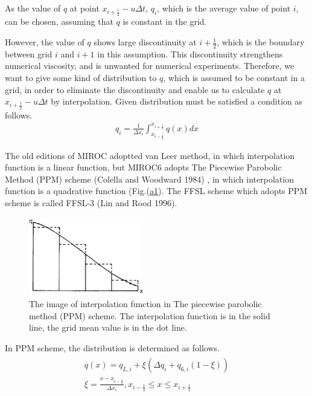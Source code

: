 As the value of \(q\) at point \(x_{i+\frac{1}{2}}-u\Delta t\), \(q_{i}\), which is the average value of point \(i\), can be chosen, assuming that \(q\) is constant in the grid.

However, the value of \(q\) shows large discontinuity at \(i+\frac{1}{2}\), which is the boundary between grid \(i\) and \(i+1\) in this assumption. This discontinuity strengthens numerical viscosity,
and is unwanted for numerical experiments. Therefore, we want to give some kind of distribution to \(q\), which is assumed to be constant in a grid, in order to eliminate the discontinuity and enable
us to calculate \(q\) at \(x_{i+\frac{1}{2}}-u\Delta t\) by interpolation. Given distribution must be satisfied a condition as follows.
\begin{eqnarray}q_{i}=\frac{1}{\Delta x_{i}} \int_{x_{i-\frac{1}{2}}}^{x_{i+\frac{1}{2}}} q(x) dx\end{eqnarray}

The old editions of MIROC adoptted van Leer method, in which interpolation function is a linear function, but MIROC6 adopts The Piecewise Parobolic Method (PPM) scheme (Colella and Woodward 1984) , in
which interpolation function is a quadrative function (Fig.(\url{a1}). The FFSL scheme which adopts PPM scheme is called FFSL-3 (Lin and Rood 1996).

\begin{figure}
\hypertarget{f1}{%
\centering
\includegraphics[width=5cm,height=\textheight]{../figures/ppm_interpolate.png}
\caption{The image of interpolation function in The piecewise parobolic method (PPM) scheme. The interpolation function is in the solid line, the grid mean value is in the dot line.}\label{f1}
}
\end{figure}

In PPM scheme, the distribution is determined as follows. \begin{eqnarray}
\begin{array}{c}
q(x)=q_{L, i}+\xi\left(\Delta q_{i}+q_{6, i}(1-\xi)\right) \\
\xi=\frac{x-x_{i-\frac{1}{2}}}{\Delta x_{i}}, x_{i-\frac{1}{2}} \leq x \leq x_{i+\frac{1}{2}}
\end{array}
\end{eqnarray}

